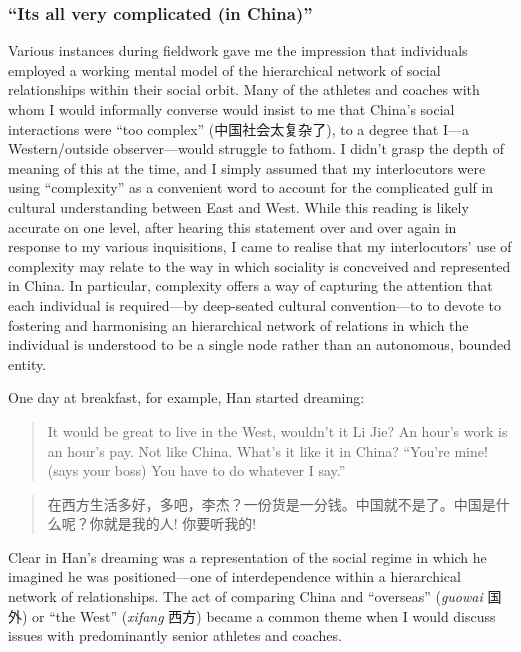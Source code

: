 \begin{CJK}{UTF8}{gbsn}
\subsubsection{``Its all very complicated (in China)''\label{sect:allComplicated}}

Various instances during fieldwork gave me the impression that individuals employed a working mental model of the hierarchical network of social relationships within their social orbit.  Many of the athletes and coaches with whom I would informally converse would insist to me that China's social interactions were ``too complex'' (中国社会太复杂了), to a degree that I---a Western/outside observer---would struggle to fathom. I didn't grasp the depth of meaning of this at the time, and I simply assumed that my interlocutors were using ``complexity'' as a convenient word to account for the complicated gulf in cultural understanding between East and West.  While this reading is likely accurate on one level, after hearing this statement over and over again in response to my various inquisitions, I came to realise that my interlocutors' use of complexity may relate to the way in which sociality is concveived and represented in China.  In particular, complexity offers a way of capturing the attention that each individual is required---by deep-seated cultural convention---to to devote to fostering and harmonising an hierarchical network of relations in which the individual is understood to be a single node rather than an autonomous, bounded entity.

One day at breakfast, for example, Han started dreaming:

\begin{quotation}
  It would be great to live in the West, wouldn’t it Li Jie?  An hour’s work is an hour’s pay.  Not like China.  What’s it like it in China? ``You’re mine! (says your boss) You have to do whatever I say.''
\end{quotation}

\begin{quotation}
  在西方生活多好，多吧，李杰？一份货是一分钱。中国就不是了。中国是什么呢？你就是我的人! 你要听我的!
\end{quotation}

Clear in Han's dreaming was a representation of the social regime in which he imagined he was positioned---one of interdependence within a hierarchical network of relationships.  The act of comparing China and ``overseas'' (\textit{guowai} 国外) or ``the West'' (\textit{xifang} 西方) became a common theme when I would discuss issues with predominantly senior athletes and coaches.


\end{CJK}
